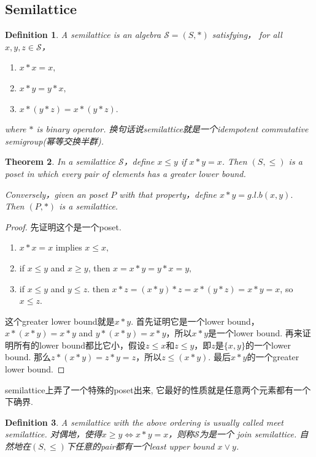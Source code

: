 \documentclass{article}
\newtheorem{theorem}{Theorem}[section]
\newtheorem{definition}[theorem]{Definition}
\newcommand\slattice{\mathcal{S}}
\begin{document}
\subsection{Semilattice}
\begin{definition}
\rm A {\color{red} semilattice} is an algebra $\mathcal{S} = (S,*)$ satisfying， for all $x,y,z \in \slattice$，
\begin{enumerate}
	\item $x * x = x,$
	\item $x * y = y *x,$
	\item $x*(y*z) = x*(y*z).$
\end{enumerate}
where $*$ is binary operator.
{\color{red} 换句话说semilattice就是一个idempotent commutative semigroup(幂等交换半群)}. 
\end{definition}

\begin{theorem}
\rm In a semilattice $\slattice$，define $x \leq y$ if $x * y = x$. Then $(S,\leq)$ is a poset in which every pair of elements has a greater lower bound.

Conversely，given an poset $P$ with that property，define $x * y = g.l.b(x,y).$ Then $(P,*)$ is a semilattice.
\end{theorem}

\begin{proof}
先证明这个是一个poset. 
\begin{enumerate}
	\item $x * x = x$ implies $x \leq x,$
	\item if $x \leq y$ and $x \geq y$, then $x = x*y  = y*x = y,$
	\item if $x \leq y$ and $ y \leq z$. then $x *z = (x * y)*z = x *(y *z) = x * y = x$, so $x \leq z$.
\end{enumerate}
这个greater lower bound就是$x * y$. 首先证明它是一个lower bound，$x *(x*y)=x*y$ and $y*(x*y) = x*y$，所以$x*y$是一个lower bound. 再来证明所有的lower bound都比它小，假设$z \leq x$和$z \leq y$，即$z$是$\{x,y\}$的一个lower bound. 那么$z * (x * y) = z * y = z$，所以$z \leq (x*y)$. 最后$x*y$的一个greater lower bound. 
\end{proof}

{\color{blue} semilattice上弄了一个特殊的poset出来, 它最好的性质就是任意两个元素都有一个下确界}.

\begin{definition}
\rm A semilattice with the above ordering is usually called {\color{red} meet semilattice}. 对偶地，使得$x \geq y \iff x * y = x$，则称$\slattice$为是一个{\color{red} join semilattice}. 自然地在$(S,\leq)$下任意的pair都有一个least upper bound $x \vee y$.
\end{definition}
\end{document}
